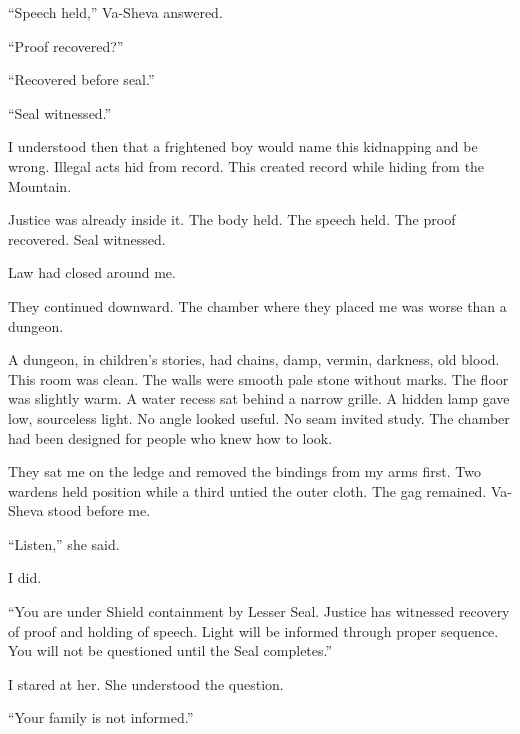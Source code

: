 ``Speech held,'' Va-Sheva answered.\par

``Proof recovered?''\par

``Recovered before seal.''\par

``Seal witnessed.''\par

I understood then that a frightened boy would name this kidnapping and be wrong. Illegal acts hid from record. This created record while hiding from the Mountain.\par

Justice was already inside it. The body held. The speech held. The proof recovered. Seal witnessed.\par

Law had closed around me.\par

They continued downward. The chamber where they placed me was worse than a dungeon.\par

A dungeon, in children's stories, had chains, damp, vermin, darkness, old blood. This room was clean. The walls were smooth pale stone without marks. The floor was slightly warm. A water recess sat behind a narrow grille. A hidden lamp gave low, sourceless light. No angle looked useful. No seam invited study. The chamber had been designed for people who knew how to look.\par

They sat me on the ledge and removed the bindings from my arms first. Two wardens held position while a third untied the outer cloth. The gag remained. Va-Sheva stood before me.\par

``Listen,'' she said.\par

I did.\par

``You are under Shield containment by Lesser Seal. Justice has witnessed recovery of proof and holding of speech. Light will be informed through proper sequence. You will not be questioned until the Seal completes.''\par

I stared at her. She understood the question.\par

``Your family is not informed.''\par

